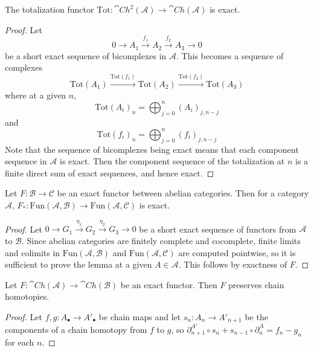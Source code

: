 \begin{lem}[label=lem:TotExact]
    The totalization functor $\text{Tot}:\cat{Ch}^2(\mathcal{A})\rightarrow \cat{Ch}(\mathcal{A})$ is exact.
\end{lem}
\begin{proof}
    Let 
    \begin{equation*}
        0\rightarrow A_1\xrightarrow{f_1} A_2\xrightarrow{f_2} A_3\rightarrow 0
    \end{equation*}
    be a short exact sequence of bicomplexes in $\mathcal{A}$. This becomes a sequence of complexes 
    \begin{equation*}
        \text{Tot}(A_1)\xrightarrow{\text{Tot}(f_1)}\text{Tot}(A_2)\xrightarrow{\text{Tot}(f_2)}\text{Tot}(A_3)
    \end{equation*}
    where at a given $n$,
    \begin{equation*}
        \text{Tot}(A_i)_n = \bigoplus_{j=0}^n(A_i)_{j,n-j}
    \end{equation*}
    and
    \begin{equation*}
        \text{Tot}(f_i)_n = \bigoplus_{j=0}^n (f_i)_{j,n-j}
    \end{equation*}
    Note that the sequence of bicomplexes being exact means that each component sequence in $\mathcal{A}$ is exact. Then the component sequence of the totalization at $n$ is a finite direct sum of exact sequences, and hence exact.
\end{proof}

\begin{lem}[label=pushForward]
    Let $F:\mathcal{B}\rightarrow \mathcal{C}$ be an exact functor between abelian categories. Then for a category $\mathcal{A}$, $F_*:\text{Fun}(\mathcal{A},\mathcal{B})\rightarrow \text{Fun}(\mathcal{A},\mathcal{C})$ is exact.
\end{lem}
\begin{proof}
    Let $0\rightarrow G_1\xrightarrow{\eta_1} G_2\xrightarrow{\eta_2} G_3\rightarrow 0$ be a short exact sequence of functors from $\mathcal{A}$ to $\mathcal{B}$. Since abelian categories are finitely complete and cocomplete, finite limits and colimits in $\text{Fun}(\mathcal{A},\mathcal{B})$ and $\text{Fun}(\mathcal{A},\mathcal{C})$ are computed pointwise, so it is sufficient to prove the lemma at a given $A \in \mathcal{A}$. This follows by exactness of $F$.
\end{proof}

\begin{lem}[label=lem:exactPresHomotop]
    Let $F:\cat{Ch}(\mathcal{A})\to \cat{Ch}(\mathcal{B})$ be an exact functor. Then $F$ preserves chain homotopies.
\end{lem}
\begin{proof}
    Let $f,g:A_\bullet\to A'_\bullet$ be chain maps and let $s_n:A_n\to A'_{n+1}$ be the components of a chain homotopy from $f$ to $g$, so $\partial_{n+1}^{A'}\circ s_n + s_{n-1}\circ \partial_n^A = f_n-g_n$ for each $n$. 
\end{proof}

